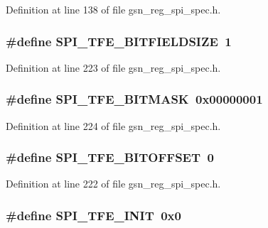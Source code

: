 Definition at line 138 of file gsn\_\-reg\_\-spi\_\-spec.h.

\hypertarget{a00573_abc6b7e8d933986cc3520eb0c5ec70b00}{
\subsubsection[{SPI\_\-TFE\_\-BITFIELDSIZE}]{\setlength{\rightskip}{0pt plus 5cm}\#define SPI\_\-TFE\_\-BITFIELDSIZE~1}}
\label{a00573_abc6b7e8d933986cc3520eb0c5ec70b00}


Definition at line 223 of file gsn\_\-reg\_\-spi\_\-spec.h.

\hypertarget{a00573_aac136ca41a3dae2e1862838501dbfde5}{
\subsubsection[{SPI\_\-TFE\_\-BITMASK}]{\setlength{\rightskip}{0pt plus 5cm}\#define SPI\_\-TFE\_\-BITMASK~0x00000001}}
\label{a00573_aac136ca41a3dae2e1862838501dbfde5}


Definition at line 224 of file gsn\_\-reg\_\-spi\_\-spec.h.

\hypertarget{a00573_ad0fa7846f16b31684616c3ac4dd7a3e5}{
\subsubsection[{SPI\_\-TFE\_\-BITOFFSET}]{\setlength{\rightskip}{0pt plus 5cm}\#define SPI\_\-TFE\_\-BITOFFSET~0}}
\label{a00573_ad0fa7846f16b31684616c3ac4dd7a3e5}


Definition at line 222 of file gsn\_\-reg\_\-spi\_\-spec.h.

\hypertarget{a00573_a43a92145fb41189a767dee62b473fe55}{
\subsubsection[{SPI\_\-TFE\_\-INIT}]{\setlength{\rightskip}{0pt plus 5cm}\#define SPI\_\-TFE\_\-INIT~0x0}}
\label{a00573_a43a92145fb41189a767dee62b473fe55}


